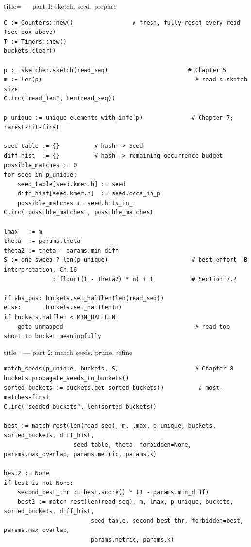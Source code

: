 \begin{algobox}{title={ --- part 1: sketch, seed, prepare}}
\begin{verbatim}
C := Counters::new()                 # fresh, fully-reset every read (see box above)
T := Timers::new()
buckets.clear()

p := sketcher.sketch(read_seq)                       # Chapter 5
m := len(p)                                            # read's sketch size
C.inc("read_len", len(read_seq))

p_unique := unique_elements_with_info(p)              # Chapter 7; rarest-hit-first

seed_table := {}          # hash -> Seed
diff_hist  := {}          # hash -> remaining occurrence budget
possible_matches := 0
for seed in p_unique:
    seed_table[seed.kmer.h] := seed
    diff_hist[seed.kmer.h]  := seed.occs_in_p
    possible_matches += seed.hits_in_t
C.inc("possible_matches", possible_matches)

lmax   := m
theta  := params.theta
theta2 := theta - params.min_diff
S := one_sweep ? len(p_unique)                        # best-effort -B interpretation, Ch.16
              : floor((1 - theta2) * m) + 1           # Section 7.2

if abs_pos: buckets.set_halflen(len(read_seq))
else:       buckets.set_halflen(m)
if buckets.halflen < MIN_HALFLEN:
    goto unmapped                                      # read too short to bucket meaningfully
\end{verbatim}
\end{algobox}

\begin{algobox}{title={ --- part 2: match seeds, prune, refine}}
\begin{verbatim}
match_seeds(p_unique, buckets, S)                      # Chapter 8
buckets.propagate_seeds_to_buckets()
sorted_buckets := buckets.get_sorted_buckets()          # most-matches-first
C.inc("seeded_buckets", len(sorted_buckets))

best := match_rest(len(read_seq), m, lmax, p_unique, buckets, sorted_buckets, diff_hist,
                    seed_table, theta, forbidden=None, params.max_overlap, params.metric, params.k)

best2 := None
if best is not None:
    second_best_thr := best.score() * (1 - params.min_diff)
    best2 := match_rest(len(read_seq), m, lmax, p_unique, buckets, sorted_buckets, diff_hist,
                         seed_table, second_best_thr, forbidden=best, params.max_overlap,
                         params.metric, params.k)
\end{verbatim}
\end{algobox}

